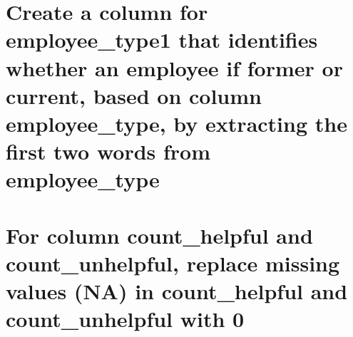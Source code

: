 \documentclass[
]{article}
\newenvironment{Shaded}{\begin{snugshade}}{\end{snugshade}}
\newcommand{\AttributeTok}[1]{\textcolor[rgb]{0.13,0.29,0.53}{#1}}
\newcommand{\CommentTok}[1]{\textcolor[rgb]{0.56,0.35,0.01}{\textit{#1}}}
\newcommand{\DecValTok}[1]{\textcolor[rgb]{0.00,0.00,0.81}{#1}}
\newcommand{\FunctionTok}[1]{\textcolor[rgb]{0.13,0.29,0.53}{\textbf{#1}}}
\newcommand{\NormalTok}[1]{#1}
\newcommand{\OtherTok}[1]{\textcolor[rgb]{0.56,0.35,0.01}{#1}}
\newcommand{\SpecialCharTok}[1]{\textcolor[rgb]{0.81,0.36,0.00}{\textbf{#1}}}
\newcommand{\StringTok}[1]{\textcolor[rgb]{0.31,0.60,0.02}{#1}}
\begin{document}
\section{Create a column for employee\_type1 that identifies whether an
employee if former or current, based on column employee\_type, by
extracting the first two words from
employee\_type}\label{create-a-column-for-employee_type1-that-identifies-whether-an-employee-if-former-or-current-based-on-column-employee_type-by-extracting-the-first-two-words-from-employee_type}

\begin{Shaded}
\begin{Highlighting}[]
\NormalTok{df}\SpecialCharTok{$}\NormalTok{employee\_type1 }\OtherTok{\textless{}{-}} \FunctionTok{sapply}\NormalTok{(}\FunctionTok{strsplit}\NormalTok{(df}\SpecialCharTok{$}\NormalTok{employee\_type, }\StringTok{" "}\NormalTok{), }\StringTok{\textasciigrave{}}\AttributeTok{[}\StringTok{\textasciigrave{}}\NormalTok{, }\DecValTok{1}\NormalTok{)}
\CommentTok{\#df$employee\_type1}
\end{Highlighting}
\end{Shaded}

\section{For column count\_helpful and count\_unhelpful, replace missing
values (NA) in count\_helpful and count\_unhelpful with
0}\label{for-column-count_helpful-and-count_unhelpful-replace-missing-values-na-in-count_helpful-and-count_unhelpful-with-0}

\begin{Shaded}
\end{Shaded}
\end{document}
